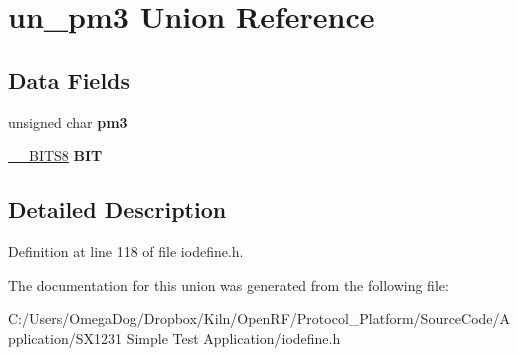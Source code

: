 \hypertarget{unionun__pm3}{\section{un\-\_\-pm3 Union Reference}
\label{unionun__pm3}
}
\subsection*{Data Fields}
\begin{DoxyCompactItemize}
\item 
\hypertarget{unionun__pm3_a121b270e2d103baaf9e101797dfee562}{unsigned char {\bfseries pm3}}\label{unionun__pm3_a121b270e2d103baaf9e101797dfee562}

\item 
\hypertarget{unionun__pm3_abc3df3e6f5c44193b4be06564e83eb59}{\hyperlink{struct_____b_i_t_s8}{\-\_\-\-\_\-\-B\-I\-T\-S8} {\bfseries B\-I\-T}}\label{unionun__pm3_abc3df3e6f5c44193b4be06564e83eb59}

\end{DoxyCompactItemize}


\subsection{Detailed Description}


Definition at line 118 of file iodefine.\-h.



The documentation for this union was generated from the following file\-:\begin{DoxyCompactItemize}
\item 
C\-:/\-Users/\-Omega\-Dog/\-Dropbox/\-Kiln/\-Open\-R\-F/\-Protocol\-\_\-\-Platform/\-Source\-Code/\-Application/\-S\-X1231 Simple Test Application/iodefine.\-h\end{DoxyCompactItemize}
